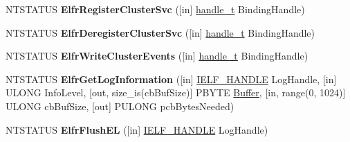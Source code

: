 \begin{DoxyCompactItemize}
\item 
\mbox{\label{interfaceeventlog_ae4657fd6ae946e89a37a2fa22b89282a}} 
N\+T\+S\+T\+A\+T\+US {\bfseries Elfr\+Register\+Cluster\+Svc} (\mbox{[}in\mbox{]} \hyperlink{interfacevoid}{handle\+\_\+t} Binding\+Handle)
\item 
\mbox{\label{interfaceeventlog_a90e3f6b4a070ee80461822c755a51d5a}} 
N\+T\+S\+T\+A\+T\+US {\bfseries Elfr\+Deregister\+Cluster\+Svc} (\mbox{[}in\mbox{]} \hyperlink{interfacevoid}{handle\+\_\+t} Binding\+Handle)
\item 
\mbox{\label{interfaceeventlog_ab418e37bff564e342bdc941ac4243be8}} 
N\+T\+S\+T\+A\+T\+US {\bfseries Elfr\+Write\+Cluster\+Events} (\mbox{[}in\mbox{]} \hyperlink{interfacevoid}{handle\+\_\+t} Binding\+Handle)
\item 
\mbox{\label{interfaceeventlog_a30657dcfe5131e391b4be85eb32185fe}} 
N\+T\+S\+T\+A\+T\+US {\bfseries Elfr\+Get\+Log\+Information} (\mbox{[}in\mbox{]} \hyperlink{interfacevoid}{I\+E\+L\+F\+\_\+\+H\+A\+N\+D\+LE} Log\+Handle, \mbox{[}in\mbox{]} U\+L\+O\+NG Info\+Level, \mbox{[}out, size\+\_\+is(cb\+Buf\+Size)\mbox{]} P\+B\+Y\+TE \hyperlink{class_buffer}{Buffer}, \mbox{[}in, range(0, 1024)\mbox{]} U\+L\+O\+NG cb\+Buf\+Size, \mbox{[}out\mbox{]} P\+U\+L\+O\+NG pcb\+Bytes\+Needed)
\item 
\mbox{\label{interfaceeventlog_a88089c4a46ec0f922b2b2ffda822ffb6}} 
N\+T\+S\+T\+A\+T\+US {\bfseries Elfr\+Flush\+EL} (\mbox{[}in\mbox{]} \hyperlink{interfacevoid}{I\+E\+L\+F\+\_\+\+H\+A\+N\+D\+LE} Log\+Handle)
\item 
\mbox{\label{interfaceeventlog_a4a1d54c4eaf3c22179589655d67ec8c3}} 

\end{DoxyCompactItemize}

